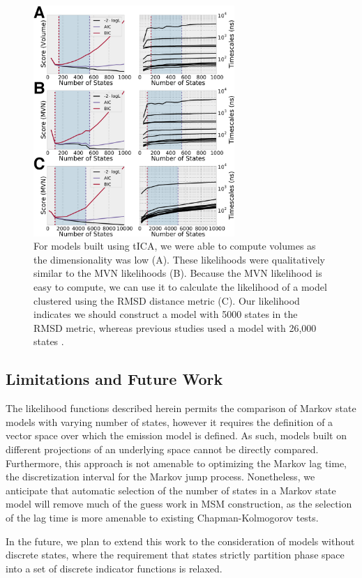 \documentclass[twocolumn,floatfix,nofootinbib,aps]{revtex4-1}
\begin{document}
\begin{figure}
\centering
\includegraphics[width=3in]{figs/ww_logLs.png}
\caption{For models built using tICA, we were able to compute volumes as the dimensionality was low (A). These likelihoods were qualitatively similar to the MVN likelihoods (B). Because the MVN likelihood is easy to compute, we can use it to calculate the likelihood of a model clustered using the RMSD distance metric (C). Our likelihood indicates we should construct a model with 5000 states in the RMSD metric, whereas previous studies used a model with 26,000 states \cite{Lane2011Markov}.}
\label{fig:ww}
\end{figure}

\subsection{Limitations and Future Work}

The likelihood functions described herein permits the comparison of Markov state models with varying number of states, however it requires the definition of a vector space over which the emission model is defined. As such, models built on different projections of an underlying space cannot be directly compared. Furthermore, this approach is not amenable to optimizing the Markov lag time, the discretization interval for the Markov jump process. Nonetheless, we anticipate that automatic selection of the number of states in a Markov state model will remove much of the guess work in MSM construction, as the selection of the lag time is more amenable to existing Chapman-Kolmogorov tests.

In the future, we plan to extend this work to the consideration of models without discrete states, where the requirement that states strictly partition phase space into a set of discrete indicator functions is relaxed.
\end{document}

